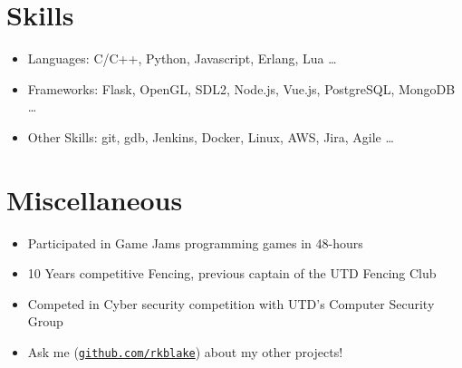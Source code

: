 \documentclass[line,margin]{res}
\begin{document}
\begin{resume}
\vspace{-4pt}
\section{Skills}
\vspace{22pt}
	\begin{itemize} \itemsep -2pt
		\item Languages: C/C++, Python, Javascript, Erlang, Lua \ldots
		\item Frameworks: Flask, OpenGL, SDL2, Node.js, Vue.js, PostgreSQL, MongoDB \ldots
		\item Other Skills: git, gdb, Jenkins, Docker, Linux, AWS, Jira, Agile \ldots
	\end{itemize}

\vspace{-4pt}
\section{Miscellaneous}
\vspace{22pt}
	\begin{itemize} \itemsep -2pt
	\item Participated in Game Jams programming games in 48-hours
	\item 10 Years competitive Fencing, previous captain of the UTD Fencing Club
	\item Competed in Cyber security competition with UTD's Computer Security Group
	\item Ask me (\href{https://github.com/rkblake}{\texttt{github.com/rkblake}}) about my other projects!
	\end{itemize}

\end{resume}
\end{document}
